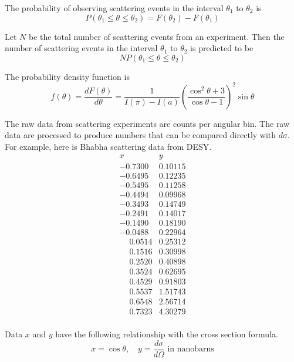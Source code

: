 \bigskip

The probability of observing scattering events in the interval $\theta_1$ to $\theta_2$ is
\begin{equation*}
P(\theta_1\le\theta\le\theta_2)=F(\theta_2)-F(\theta_1)
\end{equation*}

Let $N$ be the total number of scattering events from an experiment.
Then the number of scattering events in the interval $\theta_1$
to $\theta_2$ is predicted to be
$$
NP(\theta_1\le\theta\le\theta_2)
$$

The probability density function is
$$
f(\theta)=\frac{dF(\theta)}{d\theta}
=\frac{1}{I(\pi)-I(a)}
\left(\frac{\cos^2\theta+3}{\cos\theta-1}\right)^2
\sin\theta
$$

The raw data from scattering experiments are counts per angular bin.
The raw data are processed to produce numbers that can
be compared directly with $d\sigma$.
For example, here is Bhabha scattering data from DESY.
\begin{equation*}
\begin{matrix}
x & y\\
-0.7300 & 0.10115\\
-0.6495 & 0.12235\\
-0.5495 & 0.11258\\
-0.4494 & 0.09968\\
-0.3493 & 0.14749\\
-0.2491 & 0.14017\\
-0.1490 & 0.18190\\
-0.0488 & 0.22964\\
\phantom{+}0.0514 & 0.25312\\
\phantom{+}0.1516 & 0.30998\\
\phantom{+}0.2520 & 0.40898\\
\phantom{+}0.3524 & 0.62695\\
\phantom{+}0.4529 & 0.91803\\
\phantom{+}0.5537 & 1.51743\\
\phantom{+}0.6548 & 2.56714\\
\phantom{+}0.7323 & 4.30279\\
\end{matrix}
\end{equation*}

Data $x$ and $y$ have the following relationship with the cross section formula.
\begin{equation*}
x=\cos\theta,
\quad
y=\frac{d\sigma}{d\Omega}\text{ in nanobarns}
\end{equation*}

